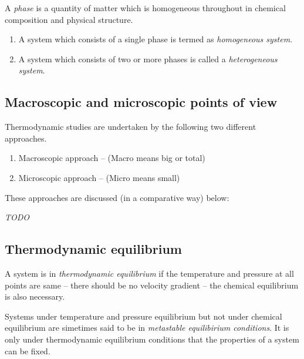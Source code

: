 \begin{definition}[Phase]
	A \emph{phase} is a quantity of matter which is homogeneous throughout in chemical composition and physical structure.
\end{definition}

\begin{definition}
	\begin{enumerate}
		\item A system which consists of a single phase is termed as \emph{homogeneous system}.
		\item A system which consists of two or more phases is called a \emph{heterogeneous system}.
	\end{enumerate}
\end{definition}

\subsection{Macroscopic and microscopic points of view}

Thermodynamic studies are undertaken by the following two different approaches.
\begin{enumerate}
	\item Macroscopic approach -- (Macro means big or total)
	\item Microscopic approach -- (Micro means small)
\end{enumerate}
These approaches are discussed (in a comparative way) below:

\emph{TODO}

\subsection{Thermodynamic equilibrium}

\begin{definition}
	A system is in \emph{thermodynamic equilibrium} if the temperature and pressure at all points are same -- there should be no velocity gradient -- the chemical equilibrium is also necessary.
\end{definition}

\begin{remark}
	Systems under temperature and pressure equilibrium but not under chemical equilibrium are simetimes said to be in \emph{metastable equilibirium conditions}.
	It is only under thermodynamic equilibrium conditions that the properties of a system can be fixed.
\end{remark}

